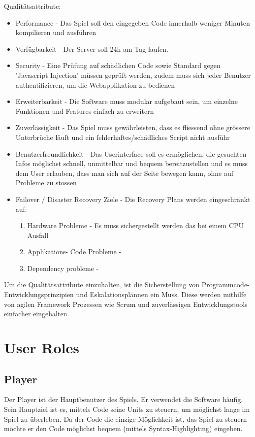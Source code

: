 \documentclass[a4paper, 11pt]{scrartcl}
\let\oldsection\section
\renewcommand\section{\clearpage\oldsection}
\begin{document}
Qualitätsattribute:
\begin{itemize}

\item Performance - Das Spiel soll den eingegeben Code innerhalb weniger Minuten kompilieren und ausführen
\item Verfügbarkeit - Der Server soll 24h am Tag laufen.
\item Security - Eine Prüfung auf schädlichen Code sowie Standard gegen 'Javascript Injection' müssen geprüft werden, zudem muss sich jeder Benutzer authentifizieren, um die Webapplikation zu bedienen
\item Erweiterbarkeit - Die Software muss modular aufgebaut sein, um einzelne Funktionen und Features einfach zu erweitern
\item Zuverlässigkeit - Das Spiel muss gewährleisten, dass es fliessend ohne grössere Unterbrüche läuft und ein fehlerhaftes/schädliches Script nicht ausführ
\item Benutzerfreundlichkeit - Das Userinterface soll es ermöglichen, die gesuchten Infos möglichst schnell, unmittelbar und bequem bereitzustellen und es muss dem User erlauben, dass man sich auf der Seite bewegen kann, ohne auf Probleme zu stossen
\item Failover / Disaster Recovery Ziele - Die Recovery Plans werden eingeschränkt auf:
\begin{enumerate}
\item Hardware Probleme - Es muss sichergestellt werden das bei einem CPU Ausfall
\item Applikations- Code Probleme -
\item Dependency probleme -
\end{enumerate}

\end{itemize}

Um die Qualitätsattribute einzuhalten, ist die Sicherstellung von Programmcode-Entwicklungsprinzipien und Eskalationsplännen ein Muss. Diese werden mithilfe von agilen Framework Prozessen wie Scrum und zuverlässigen Entwicklungstools einfacher eingehalten.

\section{User Roles}
\subsection{Player}
Der Player ist der Hauptbenutzer des Spiels. Er verwendet die Software häufig. Sein Hauptziel ist es, mittels Code seine Units zu steuern, um möglichst lange im Spiel zu überleben. Da der Code die einzige Möglichkeit ist, das Spiel zu steuern möchte er den Code möglichst bequem (mittels Syntax-Highlighting) eingeben.
\end{document}

